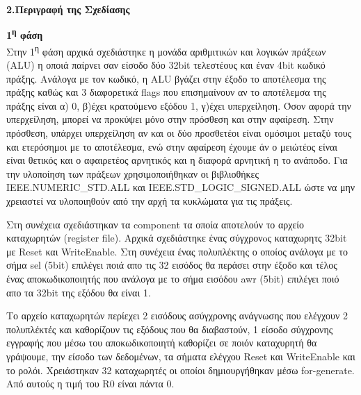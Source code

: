 { \large \bfseries 2.Περιγραφή της Σχεδίασης}\\ %



\begin{justify}
\textbf{1\textsuperscript{η} φάση}\\
Στην 1\textsuperscript{η} φάση αρχικά σχεδιάστηκε η 
μονάδα αριθμιτικών και λογικών πράξεων
(\textlatin{ALU}) η οποιά παίρνει σαν είσοδο 
δύο 32\textlatin{bit} τελεστέους και έναν 
4\textlatin{bit} κωδικό πράξης. Ανάλογα με τον κωδικό,
η \textlatin{ALU} βγάζει στην έξοδο το αποτέλεσμα
της πράξης καθώς και 3 διαφορετικά \textlatin{flags}
που επισημαίνουν αν το αποτέλεμσα της πράξης είναι
α) 0, β)έχει κρατούμενο εξόδου 1, γ)έχει υπερχείληση.
Όσον αφορά την υπερχείληση, μπορεί να προκύψει μόνο στην
πρόσθεση και στην αφαίρεση. Στην πρόσθεση, υπάρχει 
υπερχείληση αν και οι δύο προσθετέοι είναι 
ομόσιμοι μεταξύ τους και ετερόσημοι με το αποτέλεσμα, ενώ
στην αφαίρεση έχουμε άν ο μειώτέος είναι είναι θετικός και
ο αφαιρετέος αρνητικός και η διαφορά αρνητική η το ανάποδο.
Για την υλοποίηση των πράξεων χρησιμοποιήθηκαν οι 
βιβλιοθήκες \textlatin{IEEE.NUMERIC\_STD.ALL} και
\textlatin{IEEE.STD\_LOGIC\_SIGNED.ALL} ώστε να 
μην χρειαστεί να υλοποιηθούν από την αρχή τα κυκλώματα
για τις πράξεις.
\end{justify}

\begin{justify}
    Στη συνέχεια σχεδιάστηκαν τα \textlatin{component}
    τα οποία αποτελούν το αρχείο καταχωρητών (\textlatin{register file}). Αρχικά σχεδιάστηκε
    ένας σύγχρονoς καταχωρητς 32\textlatin{bit} 
    με \textlatin{Reset} και \textlatin{WriteEnable}.
    Στη συνέχεια ένας πολυπλέκτης ο οποίος ανάλογα με το
    σήμα \textlatin{sel} (\textlatin{5bit}) επιλέγει ποιά απο τις 32 εισόδος
    θα περάσει στην έξοδο και τέλος ένας αποκωδικοποιητής
    που ανάλογα με το σήμα εισόδου \textlatin{awr} (\textlatin{5bit}) επιλέγει
    ποιό απο τα \textlatin{32bit} της εξόδου θα είναι 1.
\end{justify}

\begin{justify}
    Το αρχείο καταχωρητών περίεχει 2 εισόδους ασύγχρονης
    ανάγνωσης που ελέγχουν 2 πολυπλέκτές και καθορίζουν
    τις εξόδους που θα διαβαστούν, 1 είσοδο σύγχρονης
    εγγραφής που μέσω του αποκωδικοποιητή καθορίζει σε ποιόν
    καταχυρητή θα γράψουμε, την είσοδο των δεδομένων, τα
    σήματα ελέγχου \textlatin{Reset} και \textlatin{WriteEnable}
    και το ρολόι. Χρειάστηκαν 32 καταχωρητές οι 
    οποίοι δημιουργήθηκαν μέσω \textlatin{for-generate}.
    Από αυτούς η τιμή του \textlatin{R0} είναι πάντα 0.
\end{justify}


